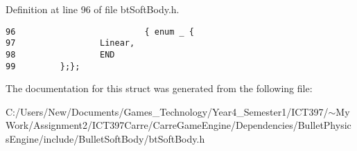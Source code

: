 Definition at line 96 of file btSoftBody.h.

\begin{Code}\begin{verbatim}96                          { enum _ {
97                 Linear,         
98                 END
99         };};
\end{verbatim}
\end{Code}




The documentation for this struct was generated from the following file:\begin{CompactItemize}
\item 
C:/Users/New/Documents/Games\_\-Technology/Year4\_\-Semester1/ICT397/$\sim$My Work/Assignment2/ICT397Carre/CarreGameEngine/Dependencies/BulletPhysicsEngine/include/BulletSoftBody/btSoftBody.h\end{CompactItemize}
